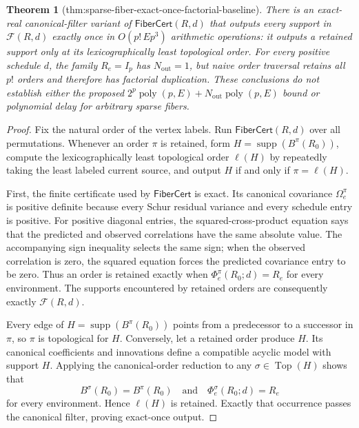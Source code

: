 \documentclass{article}
\newtheorem{theorem}{Theorem}
\begin{document}
\begin{theorem}[thm:sparse-fiber-exact-once-factorial-baseline]\label{thm:sparse-fiber-exact-once-factorial-baseline}
There is an exact-real canonical-filter variant of \(\mathsf{FiberCert}(R,d)\) that outputs every support in \(\mathcal F(R,d)\) exactly once in \(O(p!\,E p^3)\) arithmetic operations: it outputs a retained support only at its lexicographically least topological order.  For every positive schedule \(d\), the family \(R_e=I_p\) has \(N_{\mathrm{out}}=1\), but naive order traversal retains all \(p!\) orders and therefore has factorial duplication.  These conclusions do not establish either the proposed \(2^p\operatorname{poly}(p,E)+N_{\mathrm{out}}\operatorname{poly}(p,E)\) bound or polynomial delay for arbitrary sparse fibers.
\end{theorem}
\begin{proof}
Fix the natural order of the vertex labels.  Run \(\mathsf{FiberCert}(R,d)\) over all permutations.  Whenever an order \(\pi\) is retained, form
\(H=\operatorname{supp}(B^\pi(R_0))\), compute the lexicographically least topological order \(\ell(H)\) by repeatedly taking the least labeled current source, and output \(H\) if and only if \(\pi=\ell(H)\).

First, the finite certificate used by \(\mathsf{FiberCert}\) is exact.  Its canonical covariance \(\Omega_e^\pi\) is positive definite because every Schur residual variance and every schedule entry is positive.  For positive diagonal entries, the squared-cross-product equation says that the predicted and observed correlations have the same absolute value.  The accompanying sign inequality selects the same sign; when the observed correlation is zero, the squared equation forces the predicted covariance entry to be zero.  Thus an order is retained exactly when \(\Phi_e^\pi(R_0;d)=R_e\) for every environment.  The supports encountered by retained orders are consequently exactly \(\mathcal F(R,d)\).

Every edge of \(H=\operatorname{supp}(B^\pi(R_0))\) points from a predecessor to a successor in \(\pi\), so \(\pi\) is topological for \(H\).  Conversely, let a retained order produce \(H\).  Its canonical coefficients and innovations define a compatible acyclic model with support \(H\).  Applying the canonical-order reduction to any \(\sigma\in\operatorname{Top}(H)\) shows that
\[
 B^\sigma(R_0)=B^\pi(R_0)
 \quad\text{and}\quad
 \Phi_e^\sigma(R_0;d)=R_e
\]
for every environment.  Hence \(\ell(H)\) is retained.  Exactly that occurrence passes the canonical filter, proving exact-once output.


\end{proof}
\end{document}
